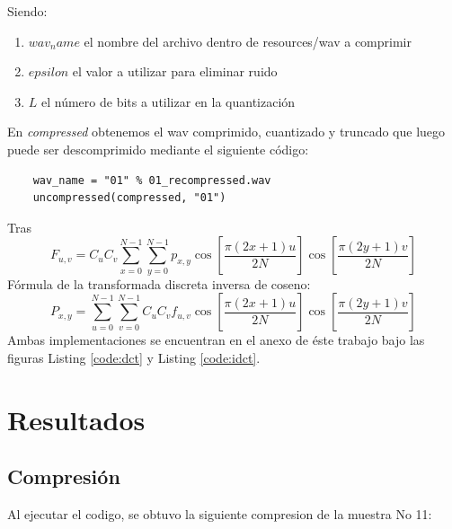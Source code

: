 \documentclass[spanish]{scrartcl}
\begin{document}
Siendo:
\begin{enumerate}
    \item $wav_name$ el nombre del archivo dentro de resources/wav a comprimir
    \item $epsilon$ el valor a utilizar para eliminar ruido
    \item $L$ el número de bits a utilizar en la quantización
\end{enumerate}
En \textit{compressed} obtenemos el wav comprimido, cuantizado y truncado que luego puede ser descomprimido mediante el siguiente código:
\begin{lstlisting}
    wav_name = "01" % 01_recompressed.wav
    uncompressed(compressed, "01")
\end{lstlisting}
Tras
\begin{equation}
\label{eq:dct}
F_{u,v} =
 C_{u} C_{v} \sum_{x=0}^{N-1}
 \sum_{y=0}^{N-1}
 p_{x,y}
\cos \left[\frac{\pi \left(2 x + 1\right) u}{2 N} \right]
\cos \left[\frac{\pi \left(2 y + 1\right) v}{2 N} \right]
\end{equation}
Fórmula de la transformada discreta inversa de coseno\cite{mathworks_DCT}:
\begin{equation}
\label{eq:idct}
P_{x,y} =
 \sum_{u=0}^{N-1}
 \sum_{v=0}^{N-1}
 C_{u} C_{v}
 f_{u,v}
\cos \left[\frac{\pi \left(2 x + 1\right) u}{2 N} \right]
\cos \left[\frac{\pi \left(2 y + 1\right) v}{2 N} \right]
\end{equation}
Ambas implementaciones se encuentran en el anexo de éste trabajo bajo las figuras Listing \ref{code:dct} y Listing \ref{code:idct}.

\section{Resultados}

\subsection{Compresión}
Al ejecutar el codigo, se obtuvo la siguiente compresion de la muestra No 11:
\end{document}

